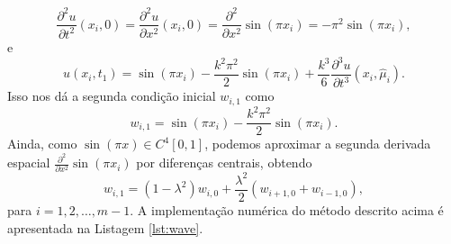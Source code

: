\documentclass[11pt]{article}
\begin{document}
\begin{equation}
    \frac{\partial^2 u}{\partial t^2}(x_i, 0) = \frac{\partial^2 u}{\partial x^2}(x_i, 0) = \frac{\partial^2}{\partial x^2} \sin(\pi x_i) = -\pi^2 \sin(\pi x_i),
\end{equation} e
\begin{equation}
    u(x_i, t_1) = \sin(\pi x_i) - \frac{k^2 \pi^2}{2} \sin(\pi x_i) + \frac{k^3}{6} \frac{\partial^3 u}{\partial t^3}(x_i, \hat{\mu}_i).
\end{equation} Isso nos dá a segunda condição inicial \(w_{i, 1}\) como
\begin{equation}
    w_{i, 1} = \sin(\pi x_i) - \frac{k^2 \pi^2}{2} \sin(\pi x_i).
\end{equation} Ainda, como \(\sin(\pi x) \in C^4[0,1]\), podemos aproximar a segunda derivada espacial \(\frac{\partial^2}{\partial x^2}\sin(\pi x_i)\) por diferenças centrais, obtendo
\begin{equation}
    w_{i, 1} = (1 - \lambda^2) w_{i, 0} + \frac{\lambda^2}{2} (w_{i+1, 0} + w_{i-1, 0}),
\end{equation} para \(i = 1, 2, \ldots, m-1\). A implementação numérica do método descrito acima é apresentada na Listagem \ref{lst:wave}.
\end{document}
